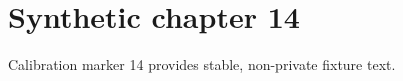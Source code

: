 \chapter{Synthetic chapter 14}\label{chap:14}
Calibration marker 14 provides stable, non-private fixture text.
